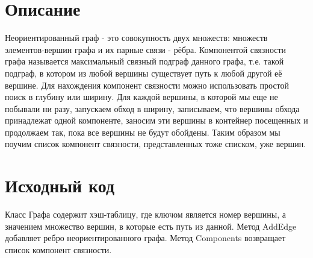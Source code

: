 \section{Описание}

Неориентированный граф - это совокупность двух множеств: множеств элементов-вершин графа и их парные связи - рёбра. Компонентой связности графа называется максимальный связный подграф данного графа, т.е. такой подграф, в котором из любой вершины существует путь к любой другой её вершине. Для нахождения компонент связности можно использовать простой поиск в глубину или ширину. 
Для каждой вершины, в которой мы еще не побывали ни разу, запускаем обход в ширину, записываем, что вершины обхода принадлежат одной компоненте, заносим эти вершины в контейнер посещенных и продолжаем так, пока все вершины не будут обойдены. Таким образом мы поучим список компонент связности, представленных тоже списком, уже вершин. 

\newpage

\section{Исходный код}

Класс Графа содержит хэш-таблицу, где ключом является номер вершины, а значением множество вершин, в которые есть путь из данной. Метод AddEdge добавляет ребро неориентированного графа. Метод Components возвращает список компонент связности.

